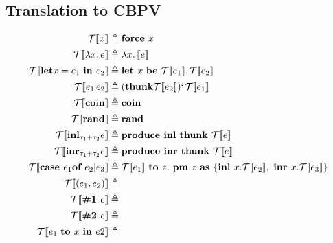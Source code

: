 \documentclass{article}
\begin{document}
\subsection{Translation to CBPV}
	\begin{equation*}
		\begin{split}
			\mathcal{T} [\![x]\!] &\triangleq 
			\text{\bf force } x \\
			\mathcal{T} [\![\lambda x.\, e]\!] &\triangleq 
			\lambda x.\, \mathcal[\![ e ]\!] \\
			\mathcal{T} [\![\text{\bf let} x = e_1 \text{ \bf in } e_2]\!] &\triangleq 
			\text{\bf let } x \text{ \bf be } \mathcal{T}[\![e_1]\!].\, \mathcal{T}[\![e_2]\!]\\
			\mathcal{T} [\![e_1\, e_2]\!] &\triangleq 
			(\text{\bf thunk} \mathcal{T}[\![e_2]\!])`\, \mathcal{T}[\![e_1]\!]\\
			\mathcal{T} [\![\text{\bf coin}]\!] &\triangleq
			\text{\bf coin} \\
			\mathcal{T} [\![\text{\bf rand}]\!] &\triangleq
			\text{\bf rand} \\
			\mathcal{T} [\![\text{\bf inl}_{\tau_1 + \tau_2} e]\!] &\triangleq
			\text{\bf produce inl thunk } \mathcal{T}[\![e]\!] \\
			\mathcal{T} [\![\text{\bf inr}_{\tau_1 + \tau_2} e]\!] &\triangleq
			\text{\bf produce inr thunk } \mathcal{T}[\![e]\!] \\
			\mathcal{T} [\![\text{\bf case } e_1 \text{\bf of } e_2 | e_3]\!] &\triangleq	
			\mathcal{T}[\![ e_1]\!] \text{ \bf to } z. \text{ \bf pm } z \text{ \bf as } 
			\{\text{\bf inl } x. \mathcal{T}[\![ e_2]\!], 
			\text{ \bf inr } x. \mathcal{T}[\![ e_3]\!]\} \\
			\mathcal{T} [\![(e_1, e_2)]\!] &\triangleq \\
			\mathcal{T} [\![\text{\bf \#1 } e]\!] &\triangleq \\
			\mathcal{T} [\![\text{\bf \#2 } e]\!] &\triangleq \\
			\mathcal{T} [\![e_1 \text{ \bf to } x \text{ \bf in } e2]\!] &\triangleq \\
		\end{split}
	\end{equation*}
\end{document}
